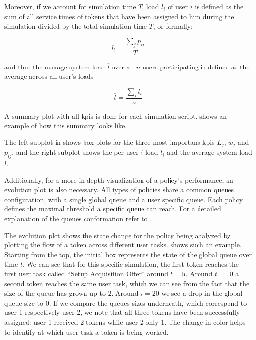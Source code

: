 Moreover, if we account for simulation time $T$, load $l_i$ of user $i$ is defined as the sum of all service times of tokens that have been assigned to him during the simulation divided by the total simulation time $T$, or formally:

\begin{equation}
	l_i=\frac{\sum_j p_{ij}}{T}
\end{equation}

and thus the average system load $\overline{l}$ over all $n$ users participating is defined as the average across all user's loads \ie

\begin{equation}
	\overline{l} = \frac{\sum_i l_i}{n}
\end{equation}

A summary plot with all \glspl{kpi} is done for each simulation script.  shows an example of how this summary looks like.


The left subplot in  shows box plots for the three most importans \glspl{kpi} \ie $L_j$, $w_j$ and $p_{ij}$, and the right subplot shows the per user $i$ load $l_i$ and the average system load $\overline{l}$.

Additionally, for a more in depth visualization of a policy's performance, an evolution plot is also necessary. All types of policies share a common queues configuration, with a single global queue and a user specific queue. Each policy defines the maximal threshold a specific queue can reach. For a detailed explanation of the queues conformation refer to .

The evolution plot shows the state change for the policy being analyzed by plotting the flow of a token across different user tasks.  shows such an example. Starting from the top, the initial box represents the state of the global queue over time $t$. We can see that for this specific simulation, the first token reaches the first user task called ``Setup Acquisition Offer'' around $t=5$. Around $t=10$ a second token reaches the same user task, which we can see from the fact that the size of the queue has grown up to $2$. Around $t=20$ we see a drop in the global queue size to $0$. If we compare the queues sizes underneath, which correspond to user 1 respectively user 2, we note that all three tokens have been successfully assigned: user 1 received 2 tokens while user 2 only 1. The change in color helps to identify at which user task a token is being worked.


